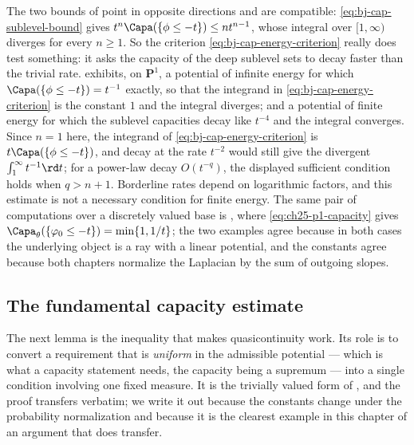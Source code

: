 \begin{remark}
\label{rem:ch48-criterion-sharp}
The two bounds of  point in opposite
directions and are compatible: \eqref{eq:bj-cap-sublevel-bound} gives
$t^n\Capa(\{\phi\le-t\})\le nt^{n-1}$, whose integral over $[1,\infty)$
diverges for every $n\ge1$.  So the criterion
\eqref{eq:bj-cap-energy-criterion} really does test something: it asks the
capacity of the deep sublevel sets to decay faster than the trivial rate.
 exhibits, on $\mathbf P^1$, a potential of
infinite energy for which $\Capa(\{\phi\le-t\})=t^{-1}$ exactly, so that
the integrand in \eqref{eq:bj-cap-energy-criterion} is the constant $1$
and the integral diverges; and a potential of finite energy for which the
sublevel capacities decay like $t^{-4}$ and the integral converges.
Since $n=1$ here, the integrand of
\eqref{eq:bj-cap-energy-criterion} is $t\Capa(\{\phi\le-t\})$, and decay
at the rate $t^{-2}$ would still give the divergent $\int_1^\infty
t^{-1}\rd t$; for a power-law decay $O(t^{-q})$, the displayed sufficient
condition holds when $q>n+1$. Borderline rates depend on logarithmic
factors, and this estimate is not a necessary condition for finite energy.  The
same pair of computations over a discretely valued base is
, where \eqref{eq:ch25-p1-capacity} gives
$\Capa_\theta(\{\varphi_0\le-t\})=\min\{1,1/t\}$; the two examples agree
because in both cases the underlying object is a ray with a linear
potential, and the constants agree because both chapters normalize the
Laplacian by the sum of outgoing slopes.
\end{remark}

\subsection{The fundamental capacity estimate}
\label{sec:ch48-fundamental}

The next lemma is the inequality that makes quasicontinuity work.  Its role
is to convert a requirement that is \emph{uniform} in the admissible
potential --- which is what a capacity statement needs, the capacity being
a supremum --- into a single condition involving one fixed measure.  It is
the trivially valued form of , and
the proof transfers verbatim; we write it out because the constants change
under the probability normalization and because it is the clearest example
in this chapter of an argument that does transfer.

